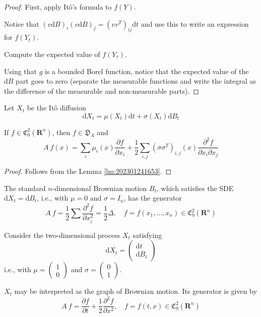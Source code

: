 \begin{proof}
    First, apply Itô's formula to $f(Y)$. 

    Notice that $(v \mathrm{d}B)_i (v \mathrm{d}B)_j = (v v^T)_{ij} \mathrm{d}t$ and use this to write an expression for $f(Y_t)$. 

    Compute the expected value of $f(Y_\tau)$.
    
    Using that $g$ is a bounded Borel function, notice that the expected value of the $\mathrm{d}B$ part goes to zero (separate the measurable functions and write the integral as the difference of the measurable and non-measurable parts). 
\end{proof}

\begin{theorem}
    Let $X_t$ be the Itô diffusion 
    \[
        \mathrm{d} X_t = \mu(X_t) \mathrm{d}t + \sigma(X_t) \mathrm{d}B_t
    \]

    If $f \in \mathfrak{C}_0^2(\textbf{R}^n)$, then $f \in \mathfrak{D}_A$ and 
    \begin{equation}\label{thm:202301261616}
        A~f(x) = \sum_i \mu_i(x) \frac{\partial f}{\partial x_i} + \frac{1}{2} \sum_{i, j} (\sigma \sigma^T)_{i,j}(x) \frac{\partial^2 f}{\partial x_i \partial x_j}
    \end{equation}
\end{theorem}

\begin{proof}
    Follows from the Lemma \ref{lm:202301241653}.
\end{proof}

\begin{example}
    The standard $n$-dimensional Brownian motion $B_t$, which satisfies the SDE $ \mathrm{d} X_t = \mathrm{d}B_t$, i.e., with $\mu = 0$ and $\sigma = I_n$, has the generator 
    \[
        A~f = \frac{1}{2} \sum \frac{\partial^2 f}{\partial x_i^2} = \frac{1}{2} \Delta, \quad f = f(x_1, \ldots, x_n) \in \mathfrak{C}_0^2(\textbf{R}^n)
    \]
\end{example}

\begin{example}
    Consider the two-dimensional process $X_t$ satisfying 
    \[
        \mathrm{d}X_t = \begin{pmatrix}
            \mathrm{d}t \\
            \mathrm{d}B_t
        \end{pmatrix}
    \]
    i.e., with $\mu = \begin{pmatrix}
        1 \\
        0
    \end{pmatrix}$ and $\sigma = \begin{pmatrix}
        0 \\
        1
    \end{pmatrix}$. 

    $X_t$ may be interpreted as the graph of Brownian motion. Its generator is given by 
    \[
        A~f = \frac{\partial f}{\partial t} + \frac{1}{2} \frac{\partial^2 f}{\partial x^2}, \quad f = f(t,x) \in \mathfrak{C}_0^2(\textbf{R}^n)
    \]
\end{example}

